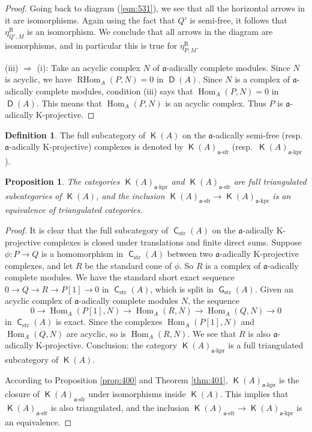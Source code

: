 \documentclass[10pt]{amsart}
\newtheorem{prop}[equation]{Proposition}
\theoremstyle{definition}
\newtheorem{dfn}[equation]{Definition}
\numberwithin{equation}{section}
\newcommand{\opn}{\operatorname}
\newcommand{\cat}[1]{\operatorname{\mathsf{#1}}}
\newcommand{\mfrak}[1]{\mathfrak{#1}}
\newcommand{\mrm}[1]{\mathrm{#1}}
\renewcommand{\a}{\mfrak{a}}
\newcommand{\tup}[1]{\textrm{#1}}
\begin{document}
\begin{proof}
Going back to diagram (\ref{eqn:531}), we see that all the horizontal
arrows in it are isomorphisms.
Again using the fact that $Q'$ is semi-free, it follows that
$\eta^{\mrm{R}}_{Q', M}$ is an isomorphism.
We conclude that all arrows in the
diagram are isomorphisms, and in particular this is true for
$\eta^{\mrm{R}}_{P, M}$.

\medskip \noindent
(iii) $\Rightarrow$ (i):
Take an acyclic complex $N$ of $\a$-adically complete modules.
Since $N$ is acyclic, we have $\opn{RHom}_{A}(P, N) = 0$ in $\cat{D}(A)$.
Since $N$ is a complex of $\a$-adically complete modules,
condition (iii) says that $\opn{Hom}_{A}(P, N) = 0$ in $\cat{D}(A)$.
This means that $\opn{Hom}_{A}(P, N)$ is an acyclic complex. Thus $P$ is
$\a$-adically K-projective.
\end{proof}

\begin{dfn} \label{dfn:160}
The full subcategory of $\cat{K}(A)$ on the
$\a$-adically semi-free (resp.\ $\a$-adically K-projective) complexes is denoted
by $\cat{K}(A)_{\tup{$\a$-sfr}}$ (resp.\ $\cat{K}(A)_{\tup{$\a$-kpr}}$).
\end{dfn}

\begin{prop} \label{prop:430}
The categories $\cat{K}(A)_{\tup{$\a$-kpr}}$
and $\cat{K}(A)_{\tup{$\a$-sfr}}$
are full triangulated subcategories of $\cat{K}(A)$,
and the inclusion
$\cat{K}(A)_{\tup{$\a$-sfr}} \to \cat{K}(A)_{\tup{$\a$-kpr}}$
is an equivalence of triangulated categories.
\end{prop}

\begin{proof}
It is clear that the full subcategory of $\cat{C}_{\mrm{str}}(A)$ on the
$\a$-adically K-projective complexes is closed under translations and finite
direct sums. Suppose $\phi : P \to Q$ is a homomorphism in
$\cat{C}_{\mrm{str}}(A)$ between two $\a$-adically K-projective complexes, and
let $R$ be the standard cone of $\phi$. So $R$ is a complex of $\a$-adically
complete modules. We have the standard short exact sequence
$0 \to Q \to R \to P[1] \to 0$
in $\cat{C}_{\mrm{str}}(A)$, which is split in
$\cat{G}_{\mrm{str}}(A)$. Given an acyclic complex of $\a$-adically complete
modules $N$, the sequence
\[ 0 \to \opn{Hom}_{A}(P[1], N) \to \opn{Hom}_{A}(R, N) \to
\opn{Hom}_{A}(Q, N) \to 0 \]
in $\cat{C}_{\mrm{str}}(A)$ is exact. Since the complexes
$\opn{Hom}_{A}(P[1], N)$ and $\opn{Hom}_{A}(Q, N)$ are acyclic, so is
$\opn{Hom}_{A}(R, N)$. We see that $R$ is also $\a$-adically K-projective.
Conclusion: the category $\cat{K}(A)_{\tup{$\a$-kpr}}$ is a full triangulated
subcategory of $\cat{K}(A)$.

According to Proposition \ref{prop:400} and Theorem \ref{thm:401},
$\cat{K}(A)_{\tup{$\a$-kpr}}$
is the closure of $\cat{K}(A)_{\tup{$\a$-sfr}}$ under isomorphisms
inside $\cat{K}(A)$. This implies that
$\cat{K}(A)_{\tup{$\a$-sfr}}$ is also triangulated, and the inclusion
$\cat{K}(A)_{\tup{$\a$-sfr}} \to \cat{K}(A)_{\tup{$\a$-kpr}}$
is an equivalence.
\end{proof}
\end{document}
